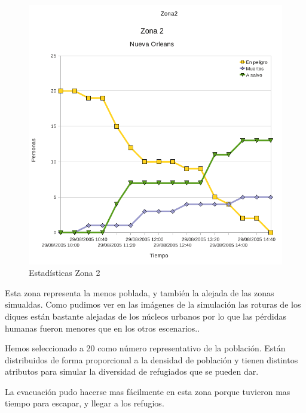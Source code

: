 \begin{figure}[H]
 \centering
 \includegraphics[width=135mm]{figuras/cap6/stats/Zona2.png}
 \caption{Estadísticas Zona 2}
\end{figure}

Esta zona representa la menos poblada, y también la alejada de las zonas
simualdas.
Como pudimos
ver en las imágenes de la simulación las roturas de los  diques están bastante
alejadas de los núcleos urbanos por lo que las pérdidas humanas fueron menores
que en los otros escenarios..

Hemos seleccionado a 20 como número representativo de la población.
Están
distribuidos de forma proporcional a la densidad de población y tienen
distintos atributos para simular la diversidad de refugiados que se pueden dar.

La evacuación pudo hacerse mas fácilmente en esta zona porque tuvieron mas
tiempo para escapar, y llegar a los refugios.



